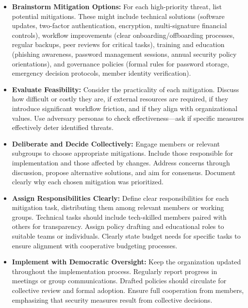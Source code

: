 \begin{itemize}

    \item \textbf{Brainstorm Mitigation Options:} For each high-priority threat,
    list potential mitigations. These might include technical solutions (software
    updates, two-factor authentication, encryption, multi-signature financial
    controls), workflow improvements (clear onboarding/offboarding processes,
    regular backups, peer reviews for critical tasks), training and education
    (phishing awareness, password management sessions, annual security policy
    orientations), and governance policies (formal rules for password storage,
    emergency decision protocols, member identity verification).
    
    \item \textbf{Evaluate Feasibility:} Consider the practicality of each
    mitigation. Discuss how difficult or costly they are, if external resources are
    required, if they introduce significant workflow friction, and if they align
    with organizational values. Use adversary personas to check effectiveness—ask if
    specific measures effectively deter identified threats.
    
    \item \textbf{Deliberate and Decide Collectively:} Engage members or relevant
    subgroups to choose appropriate mitigations. Include those responsible for
    implementation and those affected by changes. Address concerns through
    discussion, propose alternative solutions, and aim for consensus. Document
    clearly why each chosen mitigation was prioritized.
    
    \item \textbf{Assign Responsibilities Clearly:} Define clear responsibilities
    for each mitigation task, distributing them among relevant members or working
    groups. Technical tasks should include tech-skilled members paired with others
    for transparency. Assign policy drafting and educational roles to suitable teams
    or individuals. Clearly state budget needs for specific tasks to ensure
    alignment with cooperative budgeting processes.
    
    \item \textbf{Implement with Democratic Oversight:} Keep the organization
    updated throughout the implementation process. Regularly report progress in
    meetings or group communications. Drafted policies should circulate for
    collective review and formal adoption. Ensure full cooperation from members,
    emphasizing that security measures result from collective decisions.
    

\end{itemize}
